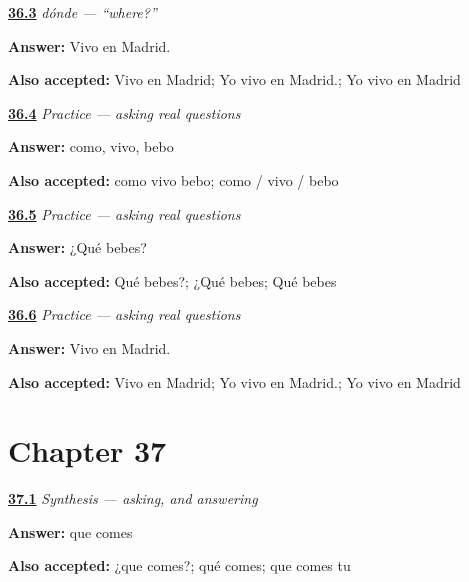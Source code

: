 \noindent\begin{minipage}[t]{\linewidth}
\raggedright
\hyperlink{review-ES-C07-donde-live-in-madrid}{\textbf{36.3}} \emph{dónde — \textquotedblleft{}where?\textquotedblright{}}\par
\small \textbf{Answer:} Vivo en Madrid.\par
\footnotesize \textbf{Also accepted:} Vivo en Madrid; Yo vivo en Madrid.; Yo vivo en Madrid
\end{minipage}\par\medskip

\noindent\begin{minipage}[t]{\linewidth}
\raggedright
\hyperlink{review-ES-C07-practice-yo-forms}{\textbf{36.4}} \emph{Practice — asking real questions}\par
\small \textbf{Answer:} como, vivo, bebo\par
\footnotesize \textbf{Also accepted:} como vivo bebo; como / vivo / bebo
\end{minipage}\par\medskip

\noindent\begin{minipage}[t]{\linewidth}
\raggedright
\hyperlink{review-ES-C07-practice-ask-what}{\textbf{36.5}} \emph{Practice — asking real questions}\par
\small \textbf{Answer:} ¿Qué bebes?\par
\footnotesize \textbf{Also accepted:} Qué bebes?; ¿Qué bebes; Qué bebes
\end{minipage}\par\medskip

\noindent\begin{minipage}[t]{\linewidth}
\raggedright
\hyperlink{review-ES-C07-practice-live-in-madrid}{\textbf{36.6}} \emph{Practice — asking real questions}\par
\small \textbf{Answer:} Vivo en Madrid.\par
\footnotesize \textbf{Also accepted:} Vivo en Madrid; Yo vivo en Madrid.; Yo vivo en Madrid
\end{minipage}\par\medskip

\section*{Chapter 37}

\noindent\begin{minipage}[t]{\linewidth}
\raggedright
\hyperlink{review-ES-C07-sintesis-preguntar-what}{\textbf{37.1}} \emph{Synthesis — asking, and answering}\par
\small \textbf{Answer:} que comes\par
\footnotesize \textbf{Also accepted:} ¿que comes?; qué comes; que comes tu
\end{minipage}\par\medskip

